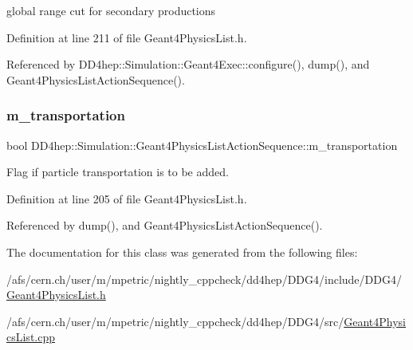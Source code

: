 global range cut for secondary productions 



Definition at line 211 of file Geant4\+Physics\+List.\+h.



Referenced by D\+D4hep\+::\+Simulation\+::\+Geant4\+Exec\+::configure(), dump(), and Geant4\+Physics\+List\+Action\+Sequence().

\hypertarget{class_d_d4hep_1_1_simulation_1_1_geant4_physics_list_action_sequence_aa8940ea98233de519fa743f4cbf02381}{}\label{class_d_d4hep_1_1_simulation_1_1_geant4_physics_list_action_sequence_aa8940ea98233de519fa743f4cbf02381} 
\subsubsection{\texorpdfstring{m\+\_\+transportation}{m\_transportation}}
{\footnotesize\ttfamily bool D\+D4hep\+::\+Simulation\+::\+Geant4\+Physics\+List\+Action\+Sequence\+::m\+\_\+transportation}



Flag if particle transportation is to be added. 



Definition at line 205 of file Geant4\+Physics\+List.\+h.



Referenced by dump(), and Geant4\+Physics\+List\+Action\+Sequence().



The documentation for this class was generated from the following files\+:\begin{DoxyCompactItemize}
\item 
/afs/cern.\+ch/user/m/mpetric/nightly\+\_\+cppcheck/dd4hep/\+D\+D\+G4/include/\+D\+D\+G4/\hyperlink{_geant4_physics_list_8h}{Geant4\+Physics\+List.\+h}\item 
/afs/cern.\+ch/user/m/mpetric/nightly\+\_\+cppcheck/dd4hep/\+D\+D\+G4/src/\hyperlink{_geant4_physics_list_8cpp}{Geant4\+Physics\+List.\+cpp}\end{DoxyCompactItemize}
